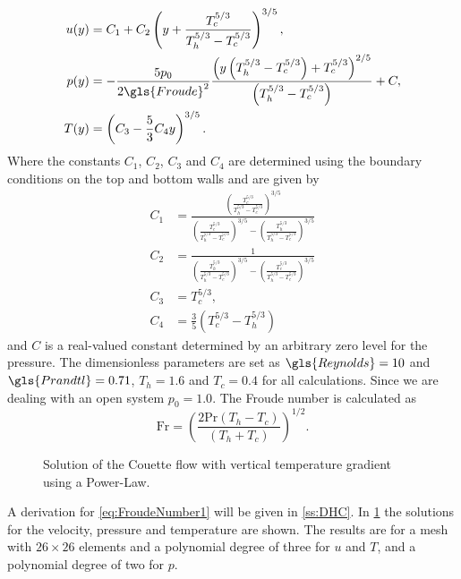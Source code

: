 \begingroup
\allowdisplaybreaks
\begin{subequations}
    \begin{align}
    	u(y) & = C_1 + C_2\left(y + \frac{T_c^{5/3}}{T_h^{5/3}-T_c^{5/3}} \right)^{3/5},\\
    	p(y) & = -\frac{5p_0}{2\gls{Froude}^2}\frac{\left(y\left(T_h^{5/3}-T_c^{5/3}\right)+T_c^{5/3}\right)^{2/5}}{\left(T_h^{5/3}-T_c^{5/3}\right)}+C,\\
    	T(y) & = \left(C_3 - \frac{5}{3}C_4 y\right)^{3/5}.
    \end{align}\label{eq:AllCouetteSolutions}
\end{subequations}
\endgroup
Where the constants $C_1$, $C_2$, $C_3$ and $C_4$ are determined using the boundary conditions on the top and bottom walls and are given by
\begin{subequations}
\begin{align}
	C_1 & = \frac{\left(\frac{T_c^{5/3}}{T_h^{5/3}-T_c^{5/3}}\right)^{3/5}}{\left(\frac{T_c^{5/3}}{T_h^{5/3}-T_c^{5/3}}\right)^{3/5}-\left(\frac{T_h^{5/3}}{T_h^{5/3}-T_c^{5/3}}\right)^{3/5}} \\
	C_2 & = \frac{1}{\left(\frac{T_h^{5/3}}{T_h^{5/3}-T_c^{5/3}}\right)^{3/5}-\left(\frac{T_c^{5/3}}{T_h^{5/3}-T_c^{5/3}}\right)^{3/5}}                                                        \\
	C_3 & = T_c^{5/3},                                                                                                                                                                         \\
	C_4 & = \frac{3}{5}\left(T_c^{5/3}-T_h^{5/3}\right)
\end{align}
\end{subequations}
and $C$ is a real-valued constant determined by an arbitrary zero level for the pressure. The dimensionless parameters are set as $\gls{Reynolds} = 10$ and $\gls{Prandtl} =0.71$, $T_h = 1.6$ and $T_c = 0.4$ for all calculations. Since we are dealing with an open system $p_0 =1.0$. The Froude number is calculated as
\begin{equation}
	\text{Fr} = \left( \frac{2\text{Pr}(T_h-T_c)}{(T_h+T_c)}\right)^{1/2}.\label{eq:FroudeNumber1}
\end{equation}
\begin{center}
	\begin{figure}[bt]
		\pgfplotsset{
			group/xticklabels at=edge bottom,
		}
		\caption{Solution of the Couette flow with vertical temperature gradient using a Power-Law.}\label{fig:CouetteSolution}
	\end{figure}
\end{center}%
A derivation for \cref{eq:FroudeNumber1} will be given in \cref{ss:DHC}. In \cref{fig:CouetteSolution} the solutions for the velocity, pressure and temperature are shown. The results are for a mesh with $26\times26$ elements and a polynomial degree of three for $u$ and $T$, and a polynomial degree of two for $p$.
